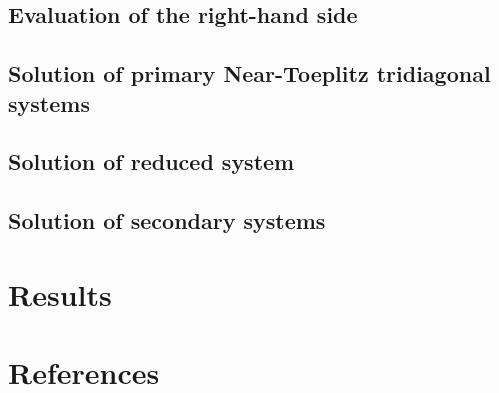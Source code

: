 \documentclass{elsarticle}
\begin{document}
\subsection{Evaluation of the right-hand side}

\subsection{Solution of primary Near-Toeplitz tridiagonal systems}

\subsection{Solution of reduced system}

\subsection{Solution of secondary systems}

\section{Results}


\section*{References}



\end{document}
